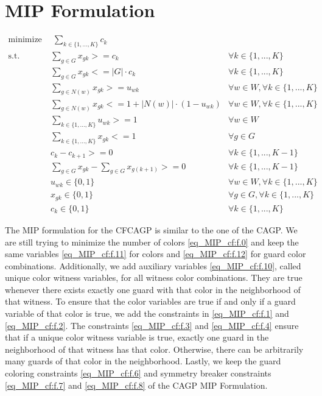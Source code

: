 \section{MIP Formulation}

\begin{align}
\label{eq_MIP_cf:f.0} \mbox{minimize}~& \;\sum_{k\in \{1,...,K\}} c_{k}& \\
\label{eq_MIP_cf:f.1} \mbox{s.t. } &\sum_{g \in G}x_{gk} >= c_{k} & \forall k\in \{1,...,K\}\\
\label{eq_MIP_cf:f.2}&\sum_{g\in G}x_{gk} <= |G|\cdot  c_{k} & \forall k\in \{1,...,K\}\\
\label{eq_MIP_cf:f.3}&\sum_{g\in N(w)}x_{gk} >= u_{wk} & \forall w\in W, \forall k\in \{1,...,K\}\\
\label{eq_MIP_cf:f.4}&\sum_{g\in N(w)}x_{gk} <= 1 + |N(w)|\cdot  (1-u_{wk}) & \forall w\in W, \forall k\in \{1,...,K\}\\
\label{eq_MIP_cf:f.5}&\sum_{k\in \{1,...,K\}}u_{wk} >= 1 & \forall w\in W\\
\label{eq_MIP_cf:f.6}&\sum_{k\in \{1,...,K\}}x_{gk} <= 1 & \forall g\in G\\
\label{eq_MIP_cf:f.7}&c_{k} - c_{k+1} >= 0 & \forall k\in \{1,...,K-1\}\\
\label{eq_MIP_cf:f.8}&\sum_{g\in G}x_{gk} - \sum_{g\in G}x_{g(k+1)} >= 0 & \forall k\in \{1,...,K-1\}\\
\label{eq_MIP_cf:f.10}& u_{wk} \in \{0,1\} & \forall w\in W, \forall k\in \{1,...,K\}\\
\label{eq_MIP_cf:f.11}& x_{gk} \in \{0,1\} & \forall g\in G, \forall k\in \{1,...,K\}\\
\label{eq_MIP_cf:f.12}& c_{k}\in \{0,1\} & \forall k\in \{1,...,K\}
\end{align}

The MIP formulation for the CFCAGP is similar to the one of the CAGP. We are still trying to minimize the number of colors \cref{eq_MIP_cf:f.0} and keep the same variables \cref{eq_MIP_cf:f.11} for colors and \cref{eq_MIP_cf:f.12} for guard color combinations. Additionally, we add auxiliary variables \cref{eq_MIP_cf:f.10}, called unique color witness variables, for all witness color combinations. They are true whenever there exists exactly one guard with that color in the neighborhood of that witness. To ensure that the color variables are true if and only if a guard variable of that color is true, we add the constraints in \cref{eq_MIP_cf:f.1} and \cref{eq_MIP_cf:f.2}. The constraints \cref{eq_MIP_cf:f.3} and \cref{eq_MIP_cf:f.4} ensure that if a unique color witness variable is true, exactly one guard in the neighborhood of that witness has that color. Otherwise, there can be arbitrarily many guards of that color in the neighborhood. Lastly, we keep the guard coloring constraints \cref{eq_MIP_cf:f.6} and symmetry breaker constraints \cref{eq_MIP_cf:f.7} and \cref{eq_MIP_cf:f.8} of the CAGP MIP Formulation.

